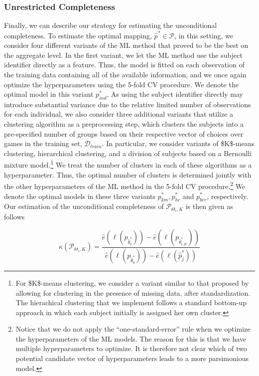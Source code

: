 \documentclass[11pt,a4paper]{article}
\theoremstyle{definition}
\begin{document}
\subsubsection{Unrestricted Completeness}
\label{subsubsec:unrestricted_completeness}
Finally, we can describe our strategy for estimating the unconditional completeness. To estimate the optimal mapping, $\hat{p}^*\in\mathcal{P}$,  in this setting, we consider four different variants of the ML method that proved to be the best on the aggregate level. In the first variant, we let the ML method use the subject identifier directly as a feature. Thus, the model is fitted on each observation of the training data containing all of the available information, and we once again optimize the hyperparameters using the 5-fold CV procedure. We denote the optimal model in this variant $p^*_{ind}$. As using the subject identifier directly may introduce substantial variance due to the relative limited number of observations for each individual, we also consider three additional variants that utilize a clustering algorithm as a preprocessing step, which clusters the subjects into a pre-specified number of groups based on their respective vector of choices over games in the training set, $\mathcal{D}_{train}$. In particular, we consider variants of \$K\$-means clustering, hierarchical clustering, and a division of subjects based on a Bernoulli mixture model.\footnote{For \$K\$-means clustering, we consider a variant similar to that proposed by \cite{Chi2016} allowing for clustering in the presence of missing data, after standardization. The hierachical clustering that we implement follows a standard bottom-up approach in which each subject initially is assigned her own cluster.} We treat the number of clusters in each of these algorithms as a hyperparameter. Thus, the optimal number of clusters is determined jointly with the other hyperparameters of the ML method in the 5-fold CV procedure.\footnote{Notice that we do not apply the ``one-standard-error'' rule when we optimize the hyperparameters of the ML models. The reason for this is that we have multiple hyperparameters to optimize. It is therefore not clear which of two potential candidate vector of hyperparameters leads to a more parsimonious model.} We denote the optimal models in these three variants $p^*_{km},p^*_{hc}$ and $p^*_{ber}$, respectively. Our estimation of the unconditional completeness of $\mathcal{P}_{\Theta_i,K}$ is then given as follows

\begin{equation}
\label{eq:uncond-completeness_estim}
\hat{\kappa}(\mathcal{P}_{\Theta_i,K})=\frac{\hat{e}(\ell(p_{\hat{\theta}^*_{0}}))-\hat{e}(\ell(p_{\hat{\theta}^*_{i,K}}))}{\hat{e}(\ell(p_{\hat{\theta}^*_{0}}))-\hat{e}(\ell(\hat{p}^*_{j}))}
\end{equation}
\end{document}
